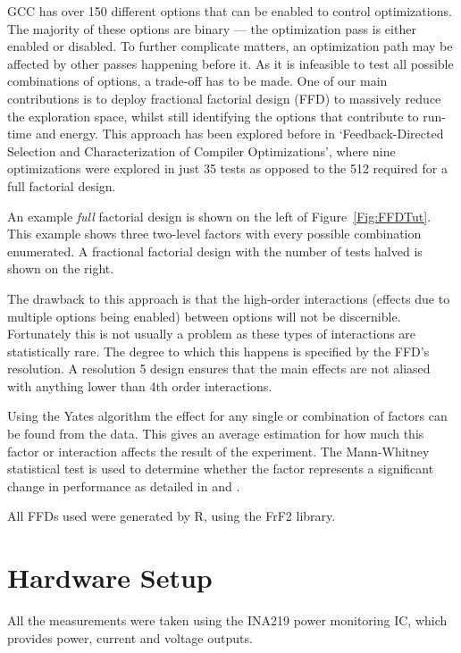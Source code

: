 \documentclass[twocolumn]{article}
\begin{document}
GCC has over 150 different options that can be enabled to control optimizations. The majority of these options are binary --- the optimization pass is either enabled or disabled. To further complicate matters, an optimization path may be affected by other passes happening before it. As it is infeasible to test all possible combinations of options, a trade-off has to be made. One of our main contributions is to deploy fractional factorial design (FFD) to massively reduce the exploration space, whilst still identifying the options that contribute to run-time and energy. This approach has been explored before in `Feedback-Directed Selection and Characterization of Compiler Optimizations'\cite{IntelPaper}, where nine optimizations were explored in just 35 tests as opposed to the 512 required for a full factorial design.

An example \textit{full} factorial design is shown on the left of Figure~\ref{Fig:FFDTut}. This example shows three two-level factors with every possible combination enumerated. A fractional factorial design with the number of tests halved is shown on the right.

The drawback to this approach is that the high-order interactions (effects due to multiple options being enabled) between options will not be discernible. Fortunately this is not usually a problem as these types of interactions are statistically rare. The degree to which this happens is specified by the FFD's resolution. A resolution 5 design ensures that the main effects are not aliased with anything lower than 4th order interactions.

Using the Yates algorithm\cite{BoxHunter} the effect for any single or combination of factors can be found from the data. This gives an average estimation for how much this factor or interaction affects the result of the experiment. The Mann-Whitney statistical test is used to determine whether the factor represents a significant change in performance as detailed in \cite{EnergyReductionCompilerOptions} and \cite{Haneda2005}.

All FFDs used were generated by R\cite{R}, using the FrF2 library\cite{FrF2}.




\section{Hardware Setup}

All the measurements were taken using the INA219 power monitoring IC\cite{INA219}, which provides power, current and voltage outputs.
\end{document}
